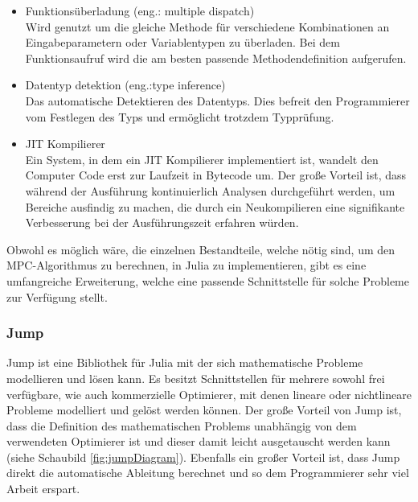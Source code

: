 \documentclass{like}
\begin{document}
\begin{itemize}
	
	\item Funktionsüberladung (eng.: multiple dispatch)\\Wird genutzt um die gleiche Methode für verschiedene Kombinationen an Eingabeparametern oder Variablentypen zu überladen. Bei dem Funktionsaufruf wird die am besten passende Methodendefinition aufgerufen. \\
	\item Datentyp detektion (eng.:type inference) \\Das automatische Detektieren des Datentyps. Dies befreit den Programmierer vom Festlegen des Typs und ermöglicht trotzdem Typprüfung. \\
	\item \ac{JIT} Kompilierer\\ Ein System, in dem ein \ac{JIT} Kompilierer implementiert ist, wandelt den Computer Code erst zur Laufzeit in Bytecode um. Der große Vorteil ist, dass während der Ausführung kontinuierlich Analysen durchgeführt werden, um Bereiche ausfindig zu machen, die durch ein Neukompilieren eine signifikante Verbesserung bei der Ausführungszeit erfahren würden. \\
\end{itemize}

Obwohl es möglich wäre, die einzelnen Bestandteile, welche nötig sind, um den \ac{MPC}-Algorithmus zu berechnen, in Julia zu implementieren, gibt es eine umfangreiche Erweiterung, welche eine passende Schnittstelle für solche Probleme zur Verfügung stellt.

\subsubsection*{Jump}
\ac{Jump} ist eine Bibliothek für Julia mit der sich mathematische Probleme modellieren und lösen kann. Es besitzt Schnittstellen für mehrere sowohl frei verfügbare, wie auch kommerzielle Optimierer, mit denen lineare oder nichtlineare Probleme modelliert und gelöst werden können. Der große Vorteil von \ac{Jump} ist, dass die Definition des mathematischen Problems unabhängig von dem verwendeten Optimierer ist und dieser damit leicht ausgetauscht werden kann (siehe Schaubild \ref{fig:jumpDiagram}). Ebenfalls ein großer Vorteil ist, dass \ac{Jump} direkt  die automatische Ableitung berechnet und so dem Programmierer sehr viel Arbeit erspart. 
\end{document}
